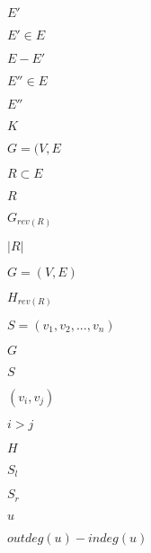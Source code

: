\documentclass{article}
\begin{document}
$E'$
\pagebreak

$E' \in E$
\pagebreak

$E - E'$
\pagebreak

$E'' \in E$
\pagebreak

$E''$
\pagebreak

$K$
\pagebreak

$G = (V, E$
\pagebreak

$R \subset E$
\pagebreak

$R$
\pagebreak

$G_{rev(R)}$
\pagebreak

$|R|$
\pagebreak

$G = (V, E)$
\pagebreak

$H_{rev(R)}$
\pagebreak

$S = (v_1, v_2, ..., v_n)$
\pagebreak

$G$
\pagebreak

$S$
\pagebreak

$(v_i, v_j)$
\pagebreak

$i > j$
\pagebreak

$H$
\pagebreak

$S_l$
\pagebreak

$S_r$
\pagebreak

$u$
\pagebreak

$outdeg(u) - indeg(u)$
\pagebreak
\end{document}
